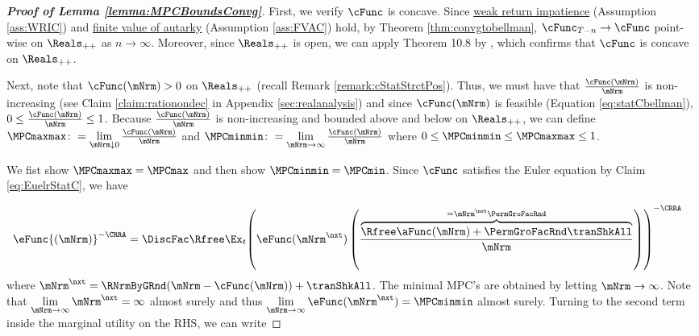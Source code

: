 \documentclass[\econtexRoot/BufferStockTheory]{subfiles}
\begin{document}
\begin{proof}[\textbf{Proof of Lemma \ref{lemma:MPCBoundsConvg}}]

First, we verify $\cFunc$ is concave.
Since \hyperlink{WRIC}{weak return impatience} (Assumption \ref{ass:WRIC}) and \hyperlink{FVAC}{finite value of autarky} (Assumption \ref{ass:FVAC}) hold, by Theorem \ref{thm:convgtobellman}, $\cFunc_{T-n}\rightarrow \cFunc$ point-wise on $\Reals_{++}$ as $n\rightarrow \infty$.
Moreover, since $\Reals_{++}$ is open, we can apply Theorem 10.8 by \cite{Rockafellar1972}, which confirms that $\cFunc$ is concave on $\Reals_{++}$.

Next, note that $\cFunc(\mNrm)>0$ on $\Reals_{++}$ (recall Remark \ref{remark:cStatStrctPos}).
Thus, we must have that $\frac{\cFunc(\mNrm)}{\mNrm}$ is non-increasing (see Claim \ref{claim:rationondec} in Appendix \ref{sec:realanalysis}) and since  $\cFunc(\mNrm)$ is feasible (Equation \ref{eq:statCbellman}), $0 \leq \frac{\cFunc(\mNrm)}{\mNrm}\leq 1$.
Because $\frac{\cFunc(\mNrm)}{\mNrm}$ is non-increasing and bounded above and below on $\Reals_{++}$, we can define $\MPCmaxmax\colon = \lim\limits_{\mNrm\downarrow 0}\frac{\cFunc(\mNrm)}{\mNrm}$ and $\MPCminmin \colon= \lim\limits_{\mNrm\rightarrow \infty}\frac{\cFunc(\mNrm)}{\mNrm}$ where $0 \leq \MPCminmin \leq \MPCmaxmax\leq 1$.


We fist show $\MPCmaxmax = \MPCmax$ and then show $\MPCminmin = \MPCmin$.
Since $\cFunc$ satisfies the Euler equation by Claim \ref{eq:EuelrStatC}, we have

\begin{equation}\begin{gathered}\begin{aligned}\label{eq:eFuncEulerStat}
 \eFunc{(\mNrm)}^{-\CRRA}  & = \DiscFac \Rfree \Ex_{t}{\left(\eFunc({\mNrm}^{\nxt})\left(\frac{\overbrace{\Rfree \aFunc(\mNrm)+{\PermGroFacRnd}{\tranShkAll}}^{={\mNrm}^{\nxt} \PermGroFacRnd}}{\mNrm}\right)\right)}^{-\CRRA }
\end{aligned}\end{gathered}\end{equation}
%
where ${\mNrm}^{\nxt} = \RNrmByGRnd(\mNrm -\cFunc(\mNrm)) +\tranShkAll$.
The minimal MPC's are obtained by letting $\mNrm \rightarrow \infty$.
Note that $\lim\limits_{\mNrm\rightarrow \infty} \mNrm^{\nxt} = \infty$ almost surely and thus $\lim\limits_{\mNrm\rightarrow \infty}\eFunc({\mNrm}^{\nxt}) = \MPCminmin$ almost surely.
Turning to the second term inside the marginal utility on the RHS, we can write


\end{proof}
\end{document}
